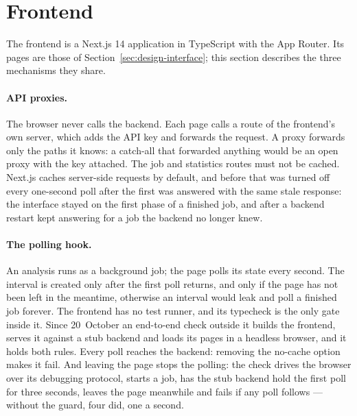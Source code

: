 
\section{Frontend}
\label{sec:dev-frontend}

The frontend is a Next.js 14 application in TypeScript with the App
Router. Its pages are those of Section~\ref{sec:design-interface}; this
section describes the three mechanisms they share.

\paragraph{API proxies.} The browser never calls the backend. Each page
calls a route of the frontend's own server, which adds the API key and
forwards the request. A proxy forwards only the paths it knows: a
catch-all that forwarded anything would be an open proxy with the key
attached. The job and statistics routes must not be cached. Next.js
caches server-side requests by default, and before that was turned off
every one-second poll after the first was answered with the same stale
response: the interface stayed on the first phase of a finished job,
and after a backend restart kept answering for a job the backend no
longer knew.

\paragraph{The polling hook.} An analysis runs as a background job; the
page polls its state every second. The interval is created only after
the first poll returns, and only if the page has not been left in the
meantime, otherwise an interval would leak and poll a finished job
forever. The frontend has no test runner, and its typecheck is the
only gate inside it. Since 20~October an end-to-end check outside it
builds the frontend, serves it against a stub backend and loads its
pages in a headless browser, and it holds both rules. Every poll
reaches the backend: removing the no-cache option makes it fail. And
leaving the page stops the polling: the check drives the browser over
its debugging protocol, starts a job, has the stub backend hold the
first poll for three seconds, leaves the page meanwhile and fails if any
poll follows --- without the guard, four did, one a second.

